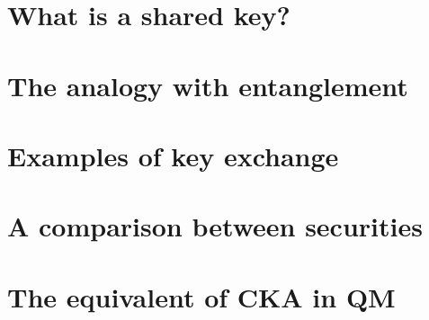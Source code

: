 \section{What is a shared key?}
    \lipsum[2]
\section{The analogy with entanglement}
    \lipsum[9]
\section{Examples of key exchange}
    \lipsum[6]
\section{A comparison between securities}
    \lipsum[7]
\section{The equivalent of CKA in QM}
    \lipsum[1]